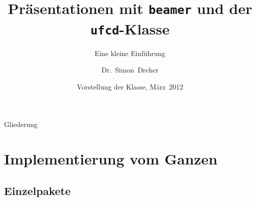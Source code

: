 \documentclass[german,english,mainlanguage=german]{beamer}
\title[beamer-ufcd] %
{Pr\"asentationen mit \texttt{beamer} und der \texttt{ufcd}-Klasse}
\subtitle
{Eine kleine Einf\"uhrung}
\author[Dr.\ S.\ Dreher] %
{Dr.~Simon~Dreher}
\institute[KVM] %
{Lehrstuhl f\"ur Konstruktion von Mikrosystemen}
\date[M\"arz~2012] %
{Vorstellung der Klasse, M\"arz~2012}
\begin{document}
\begin{frame}
  \titlepage
\end{frame}

\begin{frame}{Gliederung}
  \tableofcontents
\end{frame}

\section[Implementierung]{Implementierung vom Ganzen}

\subsection{Einzelpakete}
\end{document}
